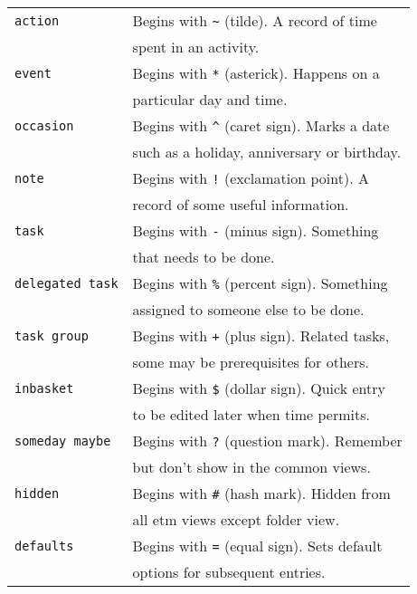\documentclass[9pt,landscape]{article}
\begin{document}
\begin{multicols}{3}
\begin{tabular}{@{}ll@{}}
\verb!action!  & Begins with \verb!~! (tilde). A record of time \\
               & spent in an activity. \\
\verb!event!   & Begins with \verb!*! (asterick). Happens on a \\
               & particular day and time. \\
\verb!occasion! & Begins with \verb!^! (caret sign). Marks a date \\
               & such as a  holiday, anniversary or birthday. \\
\verb!note!   & Begins with \verb'!' (exclamation point). A \\
              & record of some useful information. \\
\verb!task!   & Begins with \verb!-! (minus sign). Something  \\
              & that needs to be done. \\
\verb!delegated task!   & Begins with \verb!%! (percent sign). Something \\
              & assigned to someone else to be done. \\
\verb!task group!   & Begins with \verb!+! (plus sign). Related tasks, \\
              & some may be prerequisites for others. \\
\verb!inbasket!   & Begins with \verb!$! (dollar sign). Quick entry \\
              & to be edited later when time permits. \\
\verb!someday maybe!   & Begins with \verb!?! (question mark). Remember \\
              & but don't show in the common views. \\
\verb!hidden!   & Begins with \verb!#! (hash mark). Hidden from \\
              & all etm views except folder view. \\
\verb!defaults!   & Begins with \verb!=! (equal sign). Sets default \\
              & options for subsequent entries. \\
\end{tabular}



\end{multicols}
\end{document}
